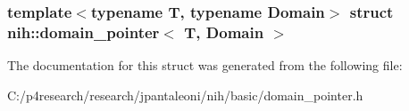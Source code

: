 \subsubsection*{template$<$typename \-T, typename \-Domain$>$ struct nih\-::domain\-\_\-pointer$<$ T, Domain $>$}



\-The documentation for this struct was generated from the following file\-:\begin{DoxyCompactItemize}
\item 
\-C\-:/p4research/research/jpantaleoni/nih/basic/domain\-\_\-pointer.\-h\end{DoxyCompactItemize}
